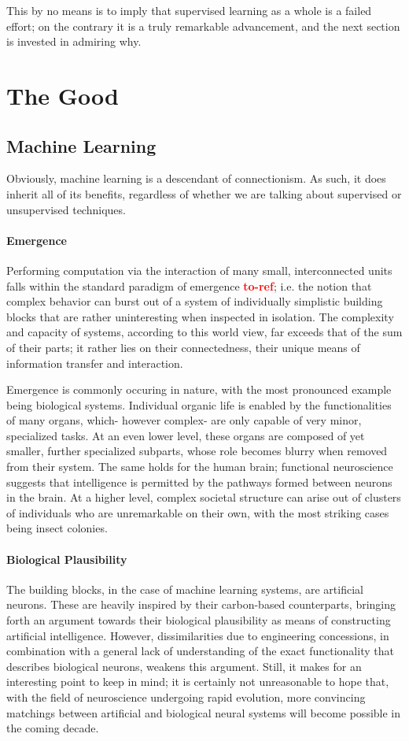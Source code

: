 \documentclass[]{article}
\newcommand\toref{\textcolor{red}{\bf{to-ref}}}
\begin{document}
This by no means is to imply that supervised learning as a whole is a failed effort; on the contrary it is a truly remarkable advancement, and the next section is invested in admiring why.

\section{The Good}

\subsection{Machine Learning}
Obviously, machine learning is a descendant of connectionism. As such, it does inherit all of its benefits, regardless of whether we are talking about supervised or unsupervised techniques.

\paragraph{Emergence}
Performing computation via the interaction of many small, interconnected units falls within the standard paradigm of emergence \toref ; i.e. the notion that complex behavior can burst out of a system of individually simplistic building blocks that are rather uninteresting when inspected in isolation. The complexity and capacity of systems, according to this world view, far exceeds that of the sum of their parts; it rather lies on their connectedness, their unique means of information transfer and interaction. 

Emergence is commonly occuring in nature, with the most pronounced example being biological systems. Individual organic life is enabled by the functionalities of many organs, which- however complex- are only capable of very minor, specialized tasks. At an even lower level, these organs are composed of yet smaller, further specialized subparts, whose role becomes blurry when removed from their system. The same holds for the human brain; functional neuroscience suggests that intelligence is permitted by the pathways formed between neurons in the brain. At a higher level, complex societal structure can arise out of clusters of individuals who are unremarkable on their own, with the most striking cases being insect colonies.

\paragraph{Biological Plausibility}
The building blocks, in the case of machine learning systems, are artificial neurons. These are heavily inspired by their carbon-based counterparts, bringing forth an argument towards their biological plausibility as means of constructing artificial intelligence. However, dissimilarities due to engineering concessions, in combination with a general lack of understanding of the exact functionality that describes biological neurons, weakens this argument. Still, it makes for an interesting point to keep in mind; it is certainly not unreasonable to hope that, with the field of neuroscience undergoing rapid evolution, more convincing matchings between artificial and biological neural systems will become possible in the coming decade.
\end{document}
